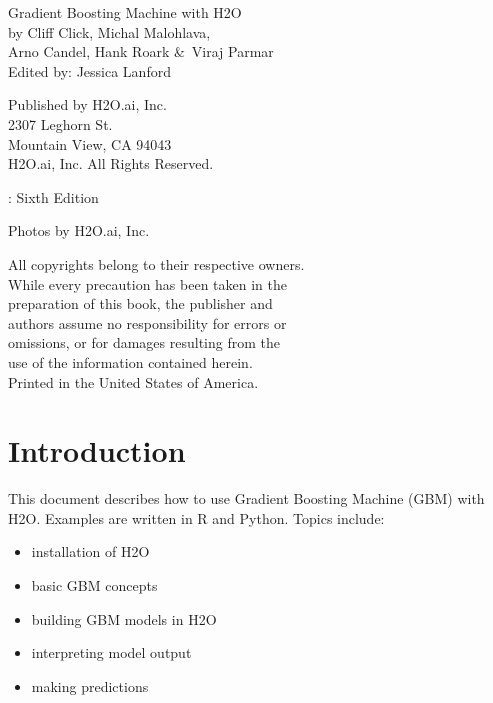 {\raggedright 

Gradient Boosting Machine with H2O\\

  by Cliff Click, Michal Malohlava, \\
Arno Candel, Hank Roark \&\  Viraj Parmar\\
Edited by: Jessica Lanford

\bigskip
  Published by H2O.ai, Inc. \\
2307 Leghorn St. \\
Mountain View, CA 94043\\
\bigskip
\textcopyright \the\year \hspace{1pt} H2O.ai, Inc. All Rights Reserved. 
\bigskip

\monthname \hspace{1pt}  \the\year: Sixth Edition
\bigskip

Photos by \textcopyright H2O.ai, Inc.
\bigskip

All copyrights belong to their respective owners.\\
While every precaution has been taken in the\\
preparation of this book, the publisher and\\
authors assume no responsibility for errors or\\
omissions, or for damages resulting from the\\
use of the information contained herein.\\
\bigskip
Printed in the United States of America. 
}


\newpage
\thispagestyle{empty}%

\tableofcontents


\newpage

\section{Introduction}
This document describes how to use Gradient Boosting Machine (GBM) with H2O.  
Examples are written in R and Python.
Topics include: 
\begin{itemize}
\item installation of H2O
\item basic GBM concepts
\item building GBM models in H2O
\item interpreting model output
\item making predictions
\end{itemize}


